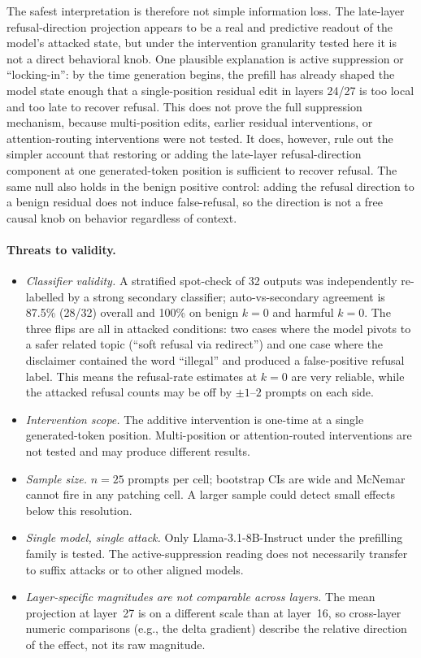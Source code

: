 \documentclass{article}
\begin{document}
The safest interpretation is therefore not simple information loss. The
late-layer refusal-direction projection appears to be a real and
predictive readout of the model's attacked state, but under the
intervention granularity tested here it is not a direct behavioral knob.
One plausible explanation is active suppression or
``locking-in'': by the time generation begins, the prefill has already
shaped the model state enough that a single-position residual edit in
layers 24/27 is too local and too late to recover refusal. This does not
prove the full suppression mechanism, because multi-position edits,
earlier residual interventions, or attention-routing interventions were
not tested. It does, however, rule out the simpler account that restoring
or adding the late-layer refusal-direction component at one generated-token
position is sufficient to recover refusal. The same null also holds in the
benign positive control: adding the refusal direction to a benign
residual does not induce false-refusal, so the direction is not a free
causal knob on behavior regardless of context.

\paragraph{Threats to validity.}
\begin{itemize}
\item \emph{Classifier validity.} A stratified spot-check of 32 outputs
  was independently re-labelled by a strong secondary classifier;
  auto-vs-secondary agreement is 87.5\% (28/32) overall
  and 100\% on benign $k=0$ and harmful $k=0$. The three flips are all in
  attacked conditions: two cases where the model pivots to a safer related
  topic (``soft refusal via redirect'') and one case where the disclaimer
  contained the word ``illegal'' and produced a false-positive refusal
  label. This means the refusal-rate estimates at $k=0$ are very
  reliable, while the attacked refusal counts may be off by $\pm 1$--$2$
  prompts on each side.
\item \emph{Intervention scope.} The additive intervention is one-time at a
  single generated-token position. Multi-position or attention-routed
  interventions are not tested and may produce different results.
\item \emph{Sample size.} $n=25$ prompts per cell; bootstrap CIs are wide
  and McNemar cannot fire in any patching cell. A larger sample could
  detect small effects below this resolution.
\item \emph{Single model, single attack.} Only Llama-3.1-8B-Instruct under
  the prefilling family is tested. The active-suppression reading does not
  necessarily transfer to suffix attacks or to other aligned models.
\item \emph{Layer-specific magnitudes are not comparable across layers.}
  The mean projection at layer~27 is on a different scale than at
  layer~16, so cross-layer numeric comparisons (e.g., the delta gradient)
  describe the relative direction of the effect, not its raw magnitude.
\end{itemize}
\end{document}
